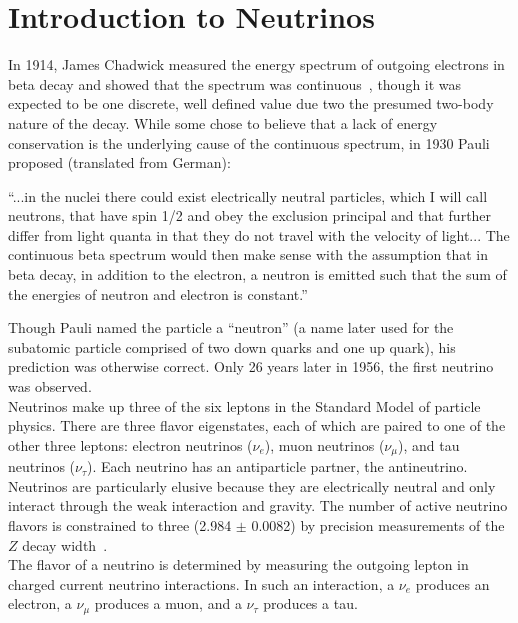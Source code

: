 \section{Introduction to Neutrinos}
In 1914, James Chadwick measured the energy spectrum of outgoing electrons in beta decay and showed that the spectrum was continuous~\cite{ChadwickSource}, though it was expected to be one discrete, well defined value due two the presumed two-body nature of the decay. While some chose to believe that a lack of energy conservation is the underlying cause of the continuous spectrum, in 1930 Pauli proposed (translated from German):
\begin{displayquote}
``...in the nuclei there could exist electrically neutral particles, which I will call neutrons, that have spin 1/2 and obey the exclusion principal and that further differ from light quanta in that they do not travel with the velocity of light... The continuous beta spectrum would then make sense with the assumption that in beta decay, in addition to the electron, a neutron is emitted such that the sum of the energies of neutron and electron is constant.''
\end{displayquote}
Though Pauli named the particle a ``neutron'' (a name later used for the subatomic particle comprised of two down quarks and one up quark), his prediction was otherwise correct. Only 26 years later in 1956, the first neutrino was observed.\\

Neutrinos make up three of the six leptons in the Standard Model of particle physics. There are three flavor eigenstates, each of which are paired to one of the other three leptons: electron neutrinos ($\nu_e$), muon neutrinos ($\nu_\mu$), and tau neutrinos ($\nu_\tau$). Each neutrino has an antiparticle partner, the antineutrino. Neutrinos are particularly elusive because they are electrically neutral and only interact through the weak interaction and gravity. The number of active neutrino flavors is constrained to three (2.984 $\pm$ 0.0082) by precision measurements of the $Z$ decay width~\cite{ZDecayWidthsource}. \\

The flavor of a neutrino is determined by measuring the outgoing lepton in charged current neutrino interactions. In such an interaction, a $\nu_e$ produces an electron, a $\nu_\mu$ produces a muon, and a $\nu_\tau$ produces a tau.\\

